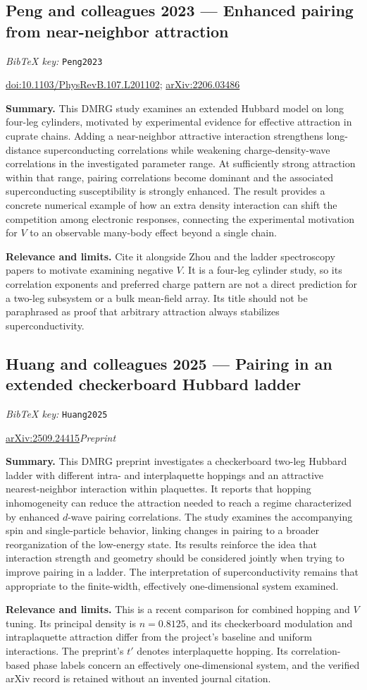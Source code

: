 \documentclass[11pt]{article}
\newcommand{\paper}[2]{\Needspace{8\baselineskip}\subsection{#2}\label{paper:#1}\textit{BibTeX key:} \texttt{#1}\quad\citep{#1}\par}
\newcommand{\doi}[1]{\href{https://doi.org/#1}{doi:#1}}
\newcommand{\arxiv}[1]{\href{https://arxiv.org/abs/#1}{arXiv:#1}}
\newcommand{\summary}{\par\textbf{Summary.} }
\newcommand{\relevance}{\par\textbf{Relevance and limits.} }
\begin{document}
\paper{Peng2023}{Peng and colleagues 2023 --- Enhanced pairing from near-neighbor attraction}
\doi{10.1103/PhysRevB.107.L201102}; \arxiv{2206.03486}
\summary This DMRG study examines an extended Hubbard model on long four-leg cylinders, motivated by experimental evidence for effective attraction in cuprate chains. Adding a near-neighbor attractive interaction strengthens long-distance superconducting correlations while weakening charge-density-wave correlations in the investigated parameter range. At sufficiently strong attraction within that range, pairing correlations become dominant and the associated superconducting susceptibility is strongly enhanced. The result provides a concrete numerical example of how an extra density interaction can shift the competition among electronic responses, connecting the experimental motivation for $V$ to an observable many-body effect beyond a single chain.
\relevance Cite it alongside Zhou and the ladder spectroscopy papers to motivate examining negative $V$. It is a four-leg cylinder study, so its correlation exponents and preferred charge pattern are not a direct prediction for a two-leg subsystem or a bulk mean-field array. Its title should not be paraphrased as proof that arbitrary attraction always stabilizes superconductivity.

\paper{Huang2025}{Huang and colleagues 2025 --- Pairing in an extended checkerboard Hubbard ladder}
\arxiv{2509.24415}\quad\textit{Preprint}
\summary This DMRG preprint investigates a checkerboard two-leg Hubbard ladder with different intra- and interplaquette hoppings and an attractive nearest-neighbor interaction within plaquettes. It reports that hopping inhomogeneity can reduce the attraction needed to reach a regime characterized by enhanced $d$-wave pairing correlations. The study examines the accompanying spin and single-particle behavior, linking changes in pairing to a broader reorganization of the low-energy state. Its results reinforce the idea that interaction strength and geometry should be considered jointly when trying to improve pairing in a ladder. The interpretation of superconductivity remains that appropriate to the finite-width, effectively one-dimensional system examined.
\relevance This is a recent comparison for combined hopping and $V$ tuning. Its principal density is $n=0.8125$, and its checkerboard modulation and intraplaquette attraction differ from the project's baseline and uniform interactions. The preprint's $t'$ denotes interplaquette hopping. Its correlation-based phase labels concern an effectively one-dimensional system, and the verified arXiv record is retained without an invented journal citation.
\end{document}

